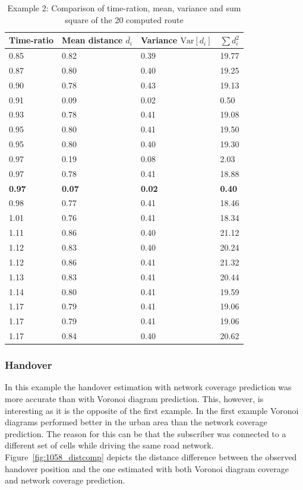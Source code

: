\documentclass[master,english]{hgbthesis}
\begin{document}
\begin{table}
\centering
\begin{tabular}{l|l|l|l}
Time-ratio & Mean distance $\overline{d_i}$ & Variance $\mathrm{Var}[d_i]$& $\sum {d}_{i}^{2}$ \\
\hline
0.85 & 0.82 & 0.39 & 19.77 \\
0.87 & 0.80 & 0.40 & 19.25 \\
0.90 & 0.78 & 0.43 & 19.13 \\
0.91 & 0.09 & 0.02 & 0.50 \\
0.93 & 0.78 & 0.41 & 19.08 \\
0.95 & 0.80 & 0.41 & 19.50 \\
0.95 & 0.80 & 0.40 & 19.30 \\
0.97 & 0.19 & 0.08 & 2.03 \\
0.97 & 0.78 & 0.41 & 18.88 \\
\textbf{0.97} & \textbf{0.07} &\textbf{0.02} &\textbf{0.40} \\
0.98 & 0.77 & 0.41 & 18.46 \\
1.01 & 0.76 & 0.41 & 18.34 \\
1.11 & 0.86 & 0.40 & 21.12 \\
1.12 & 0.83 & 0.40 & 20.24 \\
1.12 & 0.86 & 0.41 & 21.32 \\
1.13 & 0.83 & 0.41 & 20.44 \\
1.14 & 0.80 & 0.41 & 19.59 \\
1.17 & 0.79 & 0.41 & 19.06 \\
1.17 & 0.79 & 0.41 & 19.06 \\
1.17 & 0.84 & 0.40 & 20.62
\end{tabular}
\caption{Example 2: Comparison of time-ration, mean, variance and sum square of the 20 computed route}
\label{tab:1058route}
\end{table}
\subsubsection{Handover}
In this example the handover estimation with network coverage prediction was more accurate than with Voronoi diagram prediction. This, however, is interesting as it is the opposite of the first example. In the first example Voronoi diagrams performed better in the urban area than the network coverage prediction. The reason for this can be that the subscriber was connected to a different set of cells while driving the same road network. Figure~\ref{fig:1058_distcomp} depicts the distance difference between the observed handover position and the one estimated with both Voronoi diagram coverage and network coverage prediction.
\end{document}
